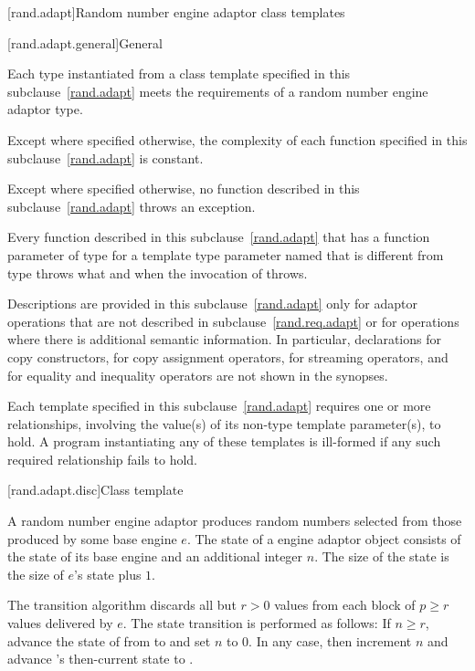 [rand.adapt]{Random number engine adaptor class templates}

[rand.adapt.general]{General}

\pnum
Each type instantiated
from a class template specified in this subclause~\ref{rand.adapt}
meets the requirements
of a random number engine adaptor type.

\pnum
Except where specified otherwise,
the complexity of each function
specified in this subclause~\ref{rand.adapt}
is constant.

\pnum
Except where specified otherwise,
no function described in this subclause~\ref{rand.adapt}
throws an exception.

\pnum
Every function described in this subclause~\ref{rand.adapt}
that has a function parameter  of type 
for a template type parameter named 
that is different from type 
throws what and when the invocation of  throws.

\pnum
Descriptions are provided in this subclause~\ref{rand.adapt}
only for adaptor operations
that are not described in subclause~\ref{rand.req.adapt}
or for operations where there is additional semantic information.
In particular,
declarations for copy constructors,
for copy assignment operators,
for streaming operators,
and for equality and inequality operators
are not shown in the synopses.

\pnum
Each template specified in this subclause~\ref{rand.adapt}
requires one or more relationships,
involving the value(s) of its non-type template parameter(s), to hold.
A program instantiating any of these templates
is ill-formed
if any such required relationship fails to hold.


[rand.adapt.disc]{Class template }%
%

\pnum
A  random number engine adaptor
produces random numbers
selected from those produced by some base engine $e$.
The state 
of a  engine adaptor object 
consists of the state  of its base engine 
and an additional integer $n$.
The size of the state is
 the size of $e$'s state plus $1$.

\pnum
The transition algorithm
discards all but $r > 0$ values
from each block of $p \geq r$ values delivered by $e$.
The state transition is performed as follows:
If $n \geq r$,
 advance the state of  from  to 
 and set $n$ to $0$.
In any case,
 then increment $n$
 and advance 's then-current state 
 to .

